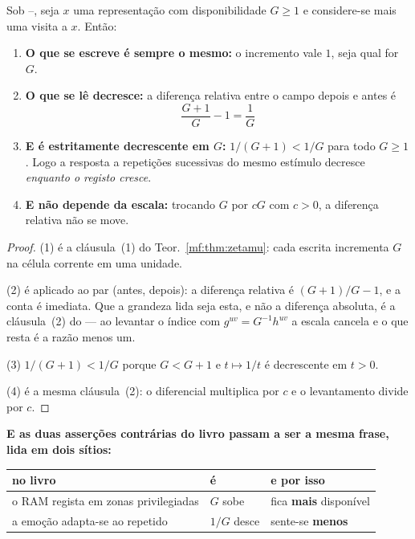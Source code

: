\documentclass[../livro.tex]{subfiles}
\begin{document}
\begin{teorema}\label{mf:thm:adapta}
Sob --, seja $x$ uma representação com disponibilidade $G\ge1$ e
considere-se mais uma visita a $x$. Então:
\begin{enumerate}\itemsep3pt
\item[(1)] \textbf{O que se escreve é sempre o mesmo:} o incremento vale $1$,
seja qual for $G$.
\item[(2)] \textbf{O que se lê decresce:} a diferença relativa entre o campo
depois e antes é
\[
\boxed{\;\frac{G+1}{G}-1=\frac{1}{G}\;}
\]
\item[(3)] \textbf{E é estritamente decrescente em $G$:} $1/(G+1)<1/G$ para todo
$G\ge1$. Logo a resposta a repetições sucessivas do mesmo estímulo decresce
\emph{enquanto o registo cresce}.
\item[(4)] \textbf{E não depende da escala:} trocando $G$ por $cG$ com $c>0$, a
diferença relativa não se move.
\end{enumerate}
\end{teorema}

\begin{proof}
(1) é a cláusula~(1) do Teor.~\ref{mf:thm:zetamu}: cada escrita incrementa $G$ na
célula corrente em uma unidade.

(2) é  aplicado ao par (antes, depois): a diferença relativa é
$(G+1)/G-1$, e a conta é imediata. Que a grandeza lida seja esta, e não a
diferença absoluta, é a cláusula~(2) do
 --- ao
levantar o índice com $g^{uv}=G^{-1}h^{uv}$ a escala cancela e o que resta é a
razão menos um.

(3) $1/(G+1)<1/G$ porque $G<G+1$ e $t\mapsto1/t$ é decrescente em $t>0$.

(4) é a mesma cláusula~(2): o diferencial multiplica por $c$ e o levantamento
divide por $c$.
\end{proof}

\medskip\noindent\textbf{E as duas asserções contrárias do livro passam a ser a
mesma frase, lida em dois sítios:}

\begin{center}\small
\begin{tabular}{@{}lll@{}}
\toprule
no livro & é & e por isso \\
\midrule
o RAM regista em zonas privilegiadas & $G$ sobe & fica \textbf{mais} disponível \\
a emoção adapta-se ao repetido & $1/G$ desce & sente-se \textbf{menos} \\
\bottomrule
\end{tabular}
\end{center}
\end{document}
